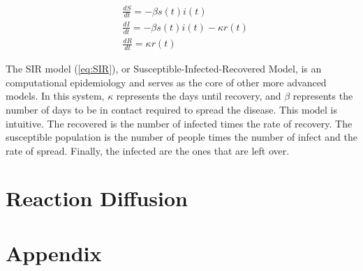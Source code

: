 \documentclass[12pt, letterpaper]{article}
\begin{document}
\begin{equation}\label{eq:SIR}
  \begin{split}
    &\frac{dS}{dt} = -\beta s(t) i(t) \\
    &\frac{dI}{dt} = -\beta s(t) i(t) - \kappa r(t) \\
    &\frac{dR}{dt} = \kappa r(t)
  \end{split}
\end{equation}

The SIR model (\ref{eq:SIR}), or Susceptible-Infected-Recovered Model, is an computational epidemiology and
serves as the core of other more advanced models. In this system, $\kappa$ represents the days until
recovery, and $\beta$ represents the number of days to be in contact required to spread the disease. This
model is intuitive. The recovered is the number of infected times the rate of recovery. The susceptible
population is the number of people times the number of infect and the rate of spread. Finally, the infected
are the ones that are left over. 

\section{Reaction Diffusion}


\newpage
\section{Appendix}
{
 \label{alg:surfaceCode}}
{
 \label{alg:gradientCode}}
{
 \label{app:diffusionCode}}
{
 \label{app:lotkaVolterraCode}}
{
 \label{app:SIRCode}}
\end{document}
